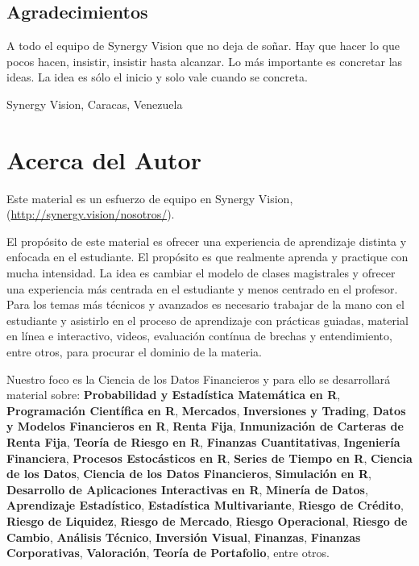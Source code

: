 \documentclass[12pt,]{krantz}
\theoremstyle{definition}
\theoremstyle{definition}
\theoremstyle{definition}
\theoremstyle{remark}
\let\BeginKnitrBlock\begin \let\EndKnitrBlock\end
\begin{document}
\section*{Agradecimientos}\label{agradecimientos}


A todo el equipo de Synergy Vision que no deja de soñar. Hay que hacer
lo que pocos hacen, insistir, insistir hasta alcanzar. Lo más importante
es concretar las ideas. La idea es sólo el inicio y solo vale cuando se
concreta.

\BeginKnitrBlock{flushright}
Synergy Vision, Caracas, Venezuela
\EndKnitrBlock{flushright}

\chapter*{Acerca del Autor}\label{acerca-del-autor}


Este material es un esfuerzo de equipo en Synergy Vision,
(\url{http://synergy.vision/nosotros/}).

El propósito de este material es ofrecer una experiencia de aprendizaje
distinta y enfocada en el estudiante. El propósito es que realmente
aprenda y practique con mucha intensidad. La idea es cambiar el modelo
de clases magistrales y ofrecer una experiencia más centrada en el
estudiante y menos centrado en el profesor. Para los temas más técnicos
y avanzados es necesario trabajar de la mano con el estudiante y
asistirlo en el proceso de aprendizaje con prácticas guiadas, material
en línea e interactivo, videos, evaluación contínua de brechas y
entendimiento, entre otros, para procurar el dominio de la materia.

Nuestro foco es la Ciencia de los Datos Financieros y para ello se
desarrollará material sobre: \textbf{Probabilidad y Estadística
Matemática en R}, \textbf{Programación Científica en R},
\textbf{Mercados}, \textbf{Inversiones y Trading}, \textbf{Datos y
Modelos Financieros en R}, \textbf{Renta Fija}, \textbf{Inmunización de
Carteras de Renta Fija}, \textbf{Teoría de Riesgo en R},
\textbf{Finanzas Cuantitativas}, \textbf{Ingeniería Financiera},
\textbf{Procesos Estocásticos en R}, \textbf{Series de Tiempo en R},
\textbf{Ciencia de los Datos}, \textbf{Ciencia de los Datos
Financieros}, \textbf{Simulación en R}, \textbf{Desarrollo de
Aplicaciones Interactivas en R}, \textbf{Minería de Datos},
\textbf{Aprendizaje Estadístico}, \textbf{Estadística Multivariante},
\textbf{Riesgo de Crédito}, \textbf{Riesgo de Liquidez}, \textbf{Riesgo
de Mercado}, \textbf{Riesgo Operacional}, \textbf{Riesgo de Cambio},
\textbf{Análisis Técnico}, \textbf{Inversión Visual}, \textbf{Finanzas},
\textbf{Finanzas Corporativas}, \textbf{Valoración}, \textbf{Teoría de
Portafolio}, entre otros.
\end{document}
